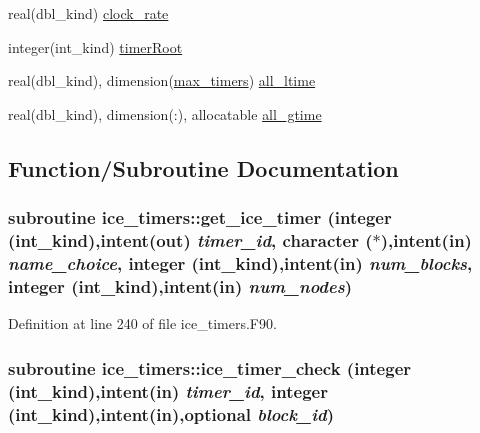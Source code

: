 \begin{DoxyCompactItemize}
\item 
real(dbl\_\-kind) \hyperlink{namespaceice__timers_a6e77da30d9249c18d6b65ff45dc46ea4}{clock\_\-rate}
\item 
integer(int\_\-kind) \hyperlink{namespaceice__timers_a1659ba1f7b638e76d301c36b9b061f85}{timerRoot}
\item 
real(dbl\_\-kind), dimension(\hyperlink{namespaceice__timers_aa410a1135c41a4e3216716ae83adfd64}{max\_\-timers}) \hyperlink{namespaceice__timers_a3974283b5a3de2b611895ae971fb9b86}{all\_\-ltime}
\item 
real(dbl\_\-kind), dimension(:), allocatable \hyperlink{namespaceice__timers_ac5562b4ab5e728d8135200ab10795610}{all\_\-gtime}
\end{DoxyCompactItemize}


\subsection{Function/Subroutine Documentation}
\hypertarget{namespaceice__timers_ae611f993fd7e53a0106a3ce5bf10c89f}{
\subsubsection[{get\_\-ice\_\-timer}]{\setlength{\rightskip}{0pt plus 5cm}subroutine ice\_\-timers::get\_\-ice\_\-timer (integer (int\_\-kind),intent(out) {\em timer\_\-id}, \/  character ($\ast$),intent(in) {\em name\_\-choice}, \/  integer (int\_\-kind),intent(in) {\em num\_\-blocks}, \/  integer (int\_\-kind),intent(in) {\em num\_\-nodes})}}
\label{namespaceice__timers_ae611f993fd7e53a0106a3ce5bf10c89f}


Definition at line 240 of file ice\_\-timers.F90.\hypertarget{namespaceice__timers_a7e731661ee334413867a1c3c6356c129}{
\subsubsection[{ice\_\-timer\_\-check}]{\setlength{\rightskip}{0pt plus 5cm}subroutine ice\_\-timers::ice\_\-timer\_\-check (integer (int\_\-kind),intent(in) {\em timer\_\-id}, \/  integer (int\_\-kind),intent(in),optional {\em block\_\-id})}}
\label{namespaceice__timers_a7e731661ee334413867a1c3c6356c129}


